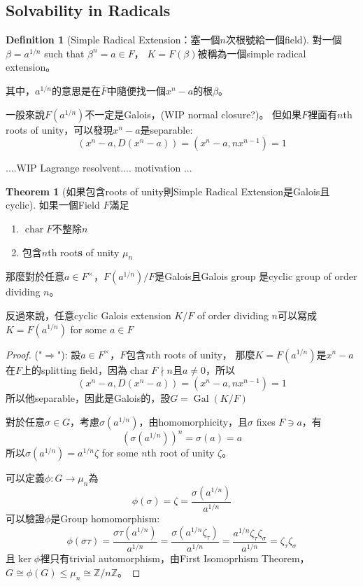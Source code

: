 \documentclass[12pt]{article}
\theoremstyle{definition}
\newtheorem{thm}{Theorem}
\newtheorem{dfn}{Definition}
\newcommand{\ZZ}{\mathbb Z}
\DeclareMathOperator{\Char}{char}
\DeclareMathOperator{\Gal}{Gal}
\begin{document}
\subsection{Solvability in Radicals}

\begin{dfn}[Simple Radical Extension：塞一個$n$次根號給一個field]
	對一個$\beta=a^{1/n}$ such that $\beta^n=a\in F$，
	$K=F(\beta)$被稱為一個simple radical extension。
\end{dfn}
其中，$a^{1/n}$的意思是在$\bar{F}$中隨便找一個$x^n-a$的根$\beta$。

一般來說$F(a^{1/n})$不一定是Galois，(WIP normal closure?)。
但如果$F$裡面有$n$th roots of unity，可以發現$x^n-a$是separable:
\[(x^n-a, D(x^n-a))=(x^n-a, nx^{n-1})=1\]

....WIP Lagrange resolvent.... motivation ...

\begin{thm}[如果包含roots of unity則Simple Radical Extension是Galois且cyclic]\label{simple_radical_extension_galois_cyclic}
	如果一個Field $F$滿足
	\begin{enumerate}
		\item $\Char{F}$不整除$n$
		\item 包含$n$th root\textbf{s} of unity $\mu_n$
	\end{enumerate}
	那麼對於任意$a\in F^\times$，$F(a^{1/n})/F$是Galois且Galois group
	是cyclic group of order dividing $n$。

	反過來說，任意cyclic Galois extension $K/F$
	of order dividing $n$可以寫成$K=F(a^{1/n})$ for some $a\in F$
\end{thm}

\begin{proof}
	\noindent ("$\Rightarrow$"): 設$a\in F^\times$，$F$包含$n$th roots of unity，
	那麼$K=F(a^{1/n})$是$x^n-a$在$F$上的splitting field，因為$\Char F\nmid n$且$a\neq 0$，所以
	\[(x^n-a, D(x^n-a))=(x^n-a, nx^{n-1})=1\]
	所以他separable，因此是Galois的，設$G=\Gal(K/F)$

	對於任意$\sigma\in G$，考慮$\sigma(a^{1/n})$，由homomorphicity，且$\sigma$ fixes $F\ni a$，有
	\[
		(\sigma(a^{1/n}))^n=\sigma(a)=a
	\]
	所以$\sigma(a^{1/n})=a^{1/n}\zeta$ for some $n$th root of unity $\zeta$。

	可以定義$\phi:G\to\mu_n$為
	\[\phi(\sigma)=\zeta=\frac{\sigma(a^{1/n})}{a^{1/n}}\]
	可以驗證$\phi$是Group homomorphism:
	\[\phi(\sigma\tau)=\frac{\sigma\tau(a^{1/n})}{a^{1/n}}
		=  \frac{\sigma(a^{1/n}\zeta_\tau)}{a^{1/n}}
		=  \frac{a^{1/n}\zeta_\tau\zeta_\sigma}{a^{1/n}}
		=\zeta_\tau \zeta_\sigma\]
	且$\ker\phi$裡只有trivial automorphism，由First Isomoprhism Theorem，$G\cong \phi(G) \le \mu_n\cong \ZZ/n\ZZ$。
\end{proof}
\end{document}
